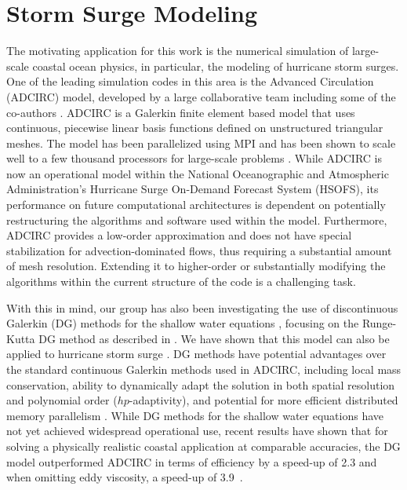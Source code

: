 \section{Storm Surge Modeling}
The motivating application for this work is the numerical simulation of large-scale coastal ocean physics, in particular, the modeling of hurricane storm surges.  One of the leading simulation codes in this area is the Advanced Circulation (ADCIRC) model, developed by a large collaborative team including some of the co-authors \cite{ADCIRC2017,Westerink2008,Bunya2010,Dietrich2010,Dietrich2011a,Dietrich2011b,Hope2016,Hope2013}.  ADCIRC is a Galerkin finite element based model that uses continuous, piecewise linear basis functions defined on unstructured triangular meshes.  The model has been parallelized using MPI and has been shown to scale well to a few thousand processors for large-scale problems \cite{Tanaka2011}.   While ADCIRC is now an operational model within the National Oceanographic and Atmospheric Administration's Hurricane Surge On-Demand Forecast System (HSOFS),  its performance on future computational architectures is dependent on potentially restructuring the algorithms and software used within the model.  Furthermore, ADCIRC provides a low-order approximation and does not have special stabilization for advection-dominated flows, thus requiring a substantial amount of mesh resolution.  Extending it to higher-order or substantially modifying the algorithms within the current structure of the code is a challenging task.

With this in mind, our group has also been investigating the use of discontinuous Galerkin (DG) methods for the shallow water equations \cite{Kubatko2006,Kubatko2009a,Kubatko2007,Bunya2009,Wirasaet2014,Wirasaet2015,Michoski2017,Michoski2015,Michoski2013,Michoski2011}, focusing on the Runge-Kutta DG method as described in \cite{Cockburn1989a}.  We have shown that this model can also be applied to  hurricane storm surge \cite{Dawson2011}.  DG methods have potential advantages over the standard continuous Galerkin methods used in ADCIRC, including local mass conservation, ability to dynamically adapt the solution in both spatial resolution and polynomial order ($hp$-adaptivity), and potential for more efficient distributed memory parallelism \cite{Kubatko2009b}.  While DG methods for the shallow water equations have not yet achieved widespread operational use, recent results have shown that for solving a physically realistic coastal application at comparable accuracies, the DG model outperformed ADCIRC in terms of efficiency by a speed-up of 2.3 and when omitting eddy viscosity, a speed-up of 3.9~\cite{Brus2017}.

